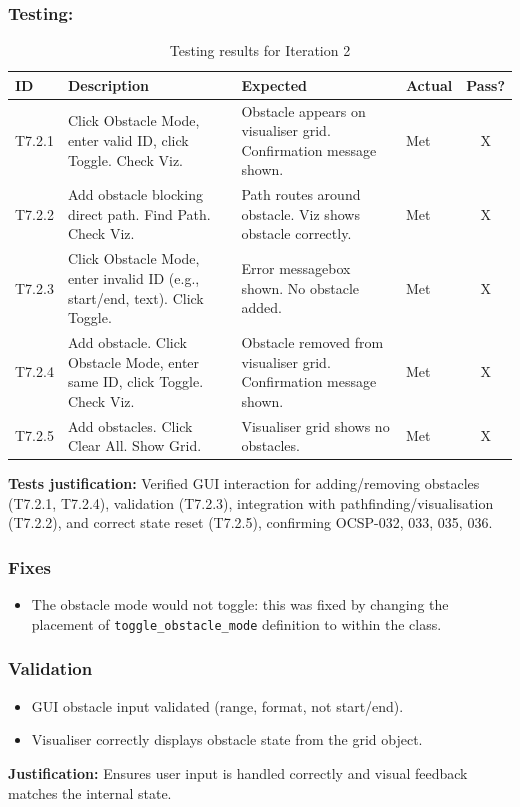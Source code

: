 \subsubsection{Testing:} %
\begin{table}[htbp]
	\centering
	\begin{tabularx}{\textwidth}{|l|X|p{4.5cm}|p{1.5cm}|c|}
		\hline
		\textbf{ID} & \textbf{Description} & \textbf{Expected} & \textbf{Actual} & \textbf{Pass?} \\
		\hline
		T7.2.1 & Click Obstacle Mode, enter valid ID, click Toggle. Check Viz. & Obstacle appears on visualiser grid. Confirmation message shown. & Met & X \\
		\hline
		T7.2.2 & Add obstacle blocking direct path. Find Path. Check Viz. & Path routes around obstacle. Viz shows obstacle correctly. & Met & X \\
		\hline
		T7.2.3 & Click Obstacle Mode, enter invalid ID (e.g., start/end, text). Click Toggle. & Error messagebox shown. No obstacle added. & Met & X \\
		\hline
		T7.2.4 & Add obstacle. Click Obstacle Mode, enter same ID, click Toggle. Check Viz. & Obstacle removed from visualiser grid. Confirmation message shown. & Met & X \\
        \hline
        T7.2.5 & Add obstacles. Click Clear All. Show Grid. & Visualiser grid shows no obstacles. & Met & X \\
		\hline
	\end{tabularx}
	\caption{Testing results for Iteration 2}
\end{table}
\textbf{Tests justification:} Verified GUI interaction for adding/removing obstacles (T7.2.1, T7.2.4), validation (T7.2.3), integration with pathfinding/visualisation (T7.2.2), and correct state reset (T7.2.5), confirming OCSP-032, 033, 035, 036.

\subsubsection{Fixes}
\begin{itemize}
	\item The obstacle mode would not toggle: this was fixed by changing the placement of \verb|toggle_obstacle_mode| definition to within the class.
\end{itemize}

\subsubsection{Validation}
\begin{itemize}
	\item GUI obstacle input validated (range, format, not start/end).
	\item Visualiser correctly displays obstacle state from the grid object.
\end{itemize}
\textbf{Justification:} Ensures user input is handled correctly and visual feedback matches the internal state.

